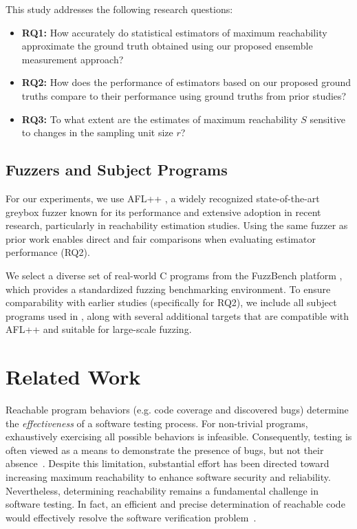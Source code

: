\documentclass[conference]{IEEEtran}
\begin{document}
This study addresses the following research questions:

\begin{itemize}
    \item \textbf{RQ1:} How accurately do statistical estimators of maximum reachability approximate the ground truth obtained using our proposed ensemble measurement approach?
    
    \item \textbf{RQ2:} How does the performance of estimators based on our proposed ground truths compare to their performance using ground truths from prior studies?
    
    \item \textbf{RQ3:} To what extent are the estimates of maximum reachability $S$ sensitive to changes in the sampling unit size $r$?
\end{itemize}

\subsection{Fuzzers and Subject Programs}

For our experiments, we use AFL++ \cite{fioraldi2020AFL++}, a widely recognized state-of-the-art greybox fuzzer known for its performance and extensive adoption in recent research, particularly in reachability estimation studies. Using the same fuzzer as prior work enables direct and fair comparisons when evaluating estimator performance (RQ2).

We select a diverse set of real-world C programs from the FuzzBench platform \cite{metzman2021fuzzbench}, which provides a standardized fuzzing benchmarking environment. To ensure comparability with earlier studies (specifically for RQ2), we include all subject programs used in \cite{liyanage2023reachable}, along with several additional targets that are compatible with AFL++ and suitable for large-scale fuzzing.


\section{Related Work}

Reachable program behaviors (e.g. code coverage and discovered bugs) determine the \emph{effectiveness} of a software testing process. For non-trivial programs, exhaustively exercising all possible behaviors is infeasible. Consequently, testing is often viewed as a means to demonstrate the presence of bugs, but not their absence~\cite{dijkstra2022reliability}. Despite this limitation, substantial effort has been directed toward increasing maximum reachability to enhance software security and reliability. Nevertheless, determining reachability remains a fundamental challenge in software testing. In fact, an efficient and precise determination of reachable code would effectively resolve the software verification problem~\cite{liyanage2023reachable}. 
\end{document}

